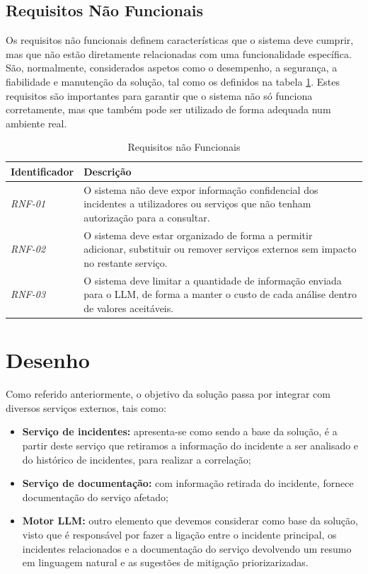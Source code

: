	\subsection{Requisitos Não Funcionais}

		Os requisitos não funcionais definem características que o sistema deve cumprir, mas que não estão diretamente relacionadas com uma funcionalidade específica. São, normalmente, considerados aspetos como o desempenho, a segurança, a fiabilidade e manutenção da solução, tal como os definidos na tabela \ref{tab:requisitos_nao_funcionais}. Estes requisitos são importantes para garantir que o sistema não só funciona corretamente, mas que também pode ser utilizado de forma adequada num ambiente real.

		\begin{table}[H]
			\centering
			\begin{tabular}{p{2.2cm}p{11cm}}
				\hline
				\textbf{Identificador} & \textbf{Descrição} \\
				\hline
				\textit{RNF-01} & O sistema não deve expor informação confidencial dos incidentes a utilizadores ou serviços que não tenham autorização para a consultar. \\
				\hline
				\textit{RNF-02} & O sistema deve estar organizado de forma a permitir adicionar, substituir ou remover serviços externos sem impacto no restante serviço. \\
				\hline
				\textit{RNF-03} & O sistema deve limitar a quantidade de informação enviada para o \gls{LLM}, de forma a manter o custo de cada análise dentro de valores aceitáveis. \\
				\hline
			\end{tabular}
			\caption[Requisitos não Funcionais]{Requisitos não Funcionais}
			\label{tab:requisitos_nao_funcionais}
		\end{table}
	
\section{Desenho}
	
	Como referido anteriormente, o objetivo da solução passa por integrar com diversos serviços externos, tais como:
	\begin{itemize}
		\item \textbf{Serviço de incidentes:} apresenta-se como sendo a base da solução, é a partir deste serviço que retiramos a informação do incidente a ser analisado e do histórico de incidentes, para realizar a correlação;
		\item \textbf{Serviço de documentação:} com informação retirada do incidente, fornece documentação do serviço afetado;
		\item \textbf{Motor \gls{LLM}:} outro elemento que devemos considerar como base da solução, visto que é responsável por fazer a ligação entre o incidente principal, os incidentes relacionados e a documentação do serviço devolvendo um resumo em linguagem natural e as sugestões de mitigação priorizarizadas.
	\end{itemize}
	
